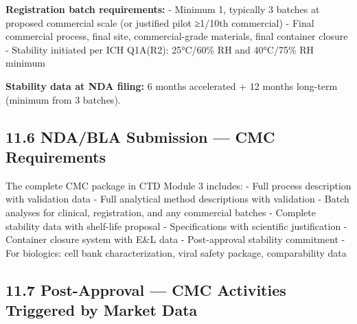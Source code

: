 \documentclass[
  11pt,
  a4paper,
]{report}
\begin{document}
\textbf{Registration batch requirements:} - Minimum 1, typically 3
batches at proposed commercial scale (or justified pilot ≥1/10th
commercial) - Final commercial process, final site, commercial-grade
materials, final container closure - Stability initiated per ICH
Q1A(R2): 25°C/60\% RH and 40°C/75\% RH minimum

\textbf{Stability data at NDA filing:} 6 months accelerated + 12 months
long-term (minimum from 3 batches).

\hypertarget{ndabla-submission-cmc-requirements}{%
\subsection{11.6 NDA/BLA Submission --- CMC
Requirements}\label{ndabla-submission-cmc-requirements}}

The complete CMC package in CTD Module 3 includes: - Full process
description with validation data - Full analytical method descriptions
with validation - Batch analyses for clinical, registration, and any
commercial batches - Complete stability data with shelf-life proposal -
Specifications with scientific justification - Container closure system
with E\&L data - Post-approval stability commitment - For biologics:
cell bank characterization, viral safety package, comparability data

\hypertarget{post-approval-cmc-activities-triggered-by-market-data}{%
\subsection{11.7 Post-Approval --- CMC Activities Triggered by Market
Data}\label{post-approval-cmc-activities-triggered-by-market-data}}
\end{document}
